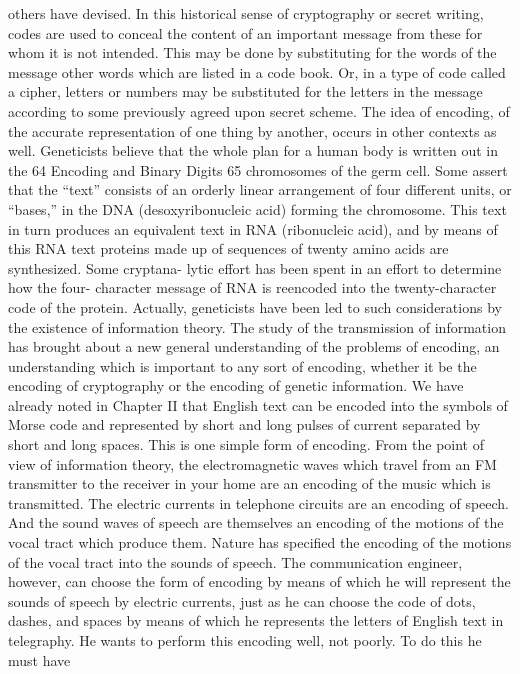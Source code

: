 others have devised.
In this historical sense of cryptography or secret writing, codes
are used to conceal the content of an important message from these
for whom it is not intended. This may be done by substituting for
the words of the message other words which are listed in a code
book. Or, in a type of code called a cipher, letters or numbers may
be substituted for the letters in the message according to some
previously agreed upon secret scheme.
The idea of encoding, of the accurate representation of one
thing by another, occurs in other contexts as well. Geneticists
believe that the whole plan for a human body is written out in the
64
Encoding and Binary Digits
65
chromosomes of the germ cell. Some assert that the “text” consists
of an orderly linear arrangement of four different units, or “bases,”
in the DNA (desoxyribonucleic acid) forming the chromosome.
This text in turn produces an equivalent text in RNA (ribonucleic
acid), and by means of this RNA text proteins made up of
sequences of twenty amino acids are synthesized. Some cryptana-
lytic effort has been spent in an effort to determine how the four-
character message of RNA is reencoded into the twenty-character
code of the protein.
Actually, geneticists have been led to such considerations by the
existence of information theory. The study of the transmission of
information has brought about a new general understanding of the
problems of encoding, an understanding which is important to any
sort of encoding, whether it be the encoding of cryptography or the
encoding of genetic information.
We have already noted in Chapter II that English text can be
encoded into the symbols of Morse code and represented by short
and long pulses of current separated by short and long spaces. This
is one simple form of encoding. From the point of view of information
theory, the electromagnetic waves which travel from an FM
transmitter to the receiver in your home are an encoding of the
music which is transmitted. The electric currents in telephone
circuits are an encoding of speech. And the sound waves of speech
are themselves an encoding of the motions of the vocal tract which
produce them.
Nature has specified the encoding of the motions of the vocal
tract into the sounds of speech. The communication engineer,
however, can choose the form of encoding by means of which he
will represent the sounds of speech by electric currents, just as he
can choose the code of dots, dashes, and spaces by means of which
he represents the letters of English text in telegraphy. He wants to
perform this encoding well, not poorly. To do this he must have
